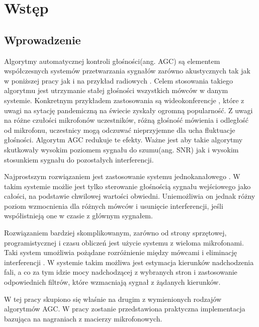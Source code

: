 \chapter{Wstęp}
\section{Wprowadzenie}

Algorytmy automatycznej kontroli głośności(ang. AGC) są elementem współczesnych systemów przetwarzania sygnałów zarówno akustycznych tak jak w poniższej pracy jak i na przykład radiowych \cite{agc_5g}. Celem stosowania takiego algorytmu jest utrzymanie stałej głośności wszystkich mówców w danym systemie. Konkretnym przykładem zastosowania są wideokonferencje \cite{agc_application}, które z uwagi na sytację pandemiczną na świecie zyskały ogromną popularność. Z uwagi na różne czułości mikrofonów uczestników, różną głośność mówienia i odległość od mikrofonu, uczestnicy mogą odczuwać nieprzyjemne dla ucha fluktuacje głośności. Algorytm AGC redukuje te efekty. Ważne jest aby takie algorytmy skutkowały wysokim poziomem sygnału do szumu(ang. SNR) jak i wysokim stosunkiem sygnału do pozostałych interferencji.

Najprostszym rozwiązaniem jest zastosowanie systemu jednokanałowego \cite{Archibald2008}. W takim systemie możlie jest tylko sterowanie głośnością sygnału wejściowego jako całości, na podstawie chwilowej wartości obwiedni. Uniemożliwia on jednak różny poziom wzmocnienia dla różnych mówców i usunięcie interferencji, jeśli współistnieją one w czasie z głównym sygnałem.

Rozwiązaniem bardziej skomplikowanym, zarówno od strony sprzętowej, programistycznej i czasu obliczeń jest użycie systemu z wieloma mikrofonami. Taki system umożliwia pożądane rozróżnienie między mówcami i eliminację interferencji \cite{Thiergart2013}. W systemie takim możliwa jest estymacja kierunków nadchodzenia fali, a co za tym idzie mocy nadchodzącej z wybranych stron i zastosowanie odpowiednich filtrów, które wzmacniają sygnał z żądanych kierunków.

W tej pracy skupiono się właśnie na drugim z wymienionych rodzajów algorytmów AGC. W pracy zostanie przedstawiona praktyczna implementacja bazująca na nagraniach z macierzy mikrofonowych.

